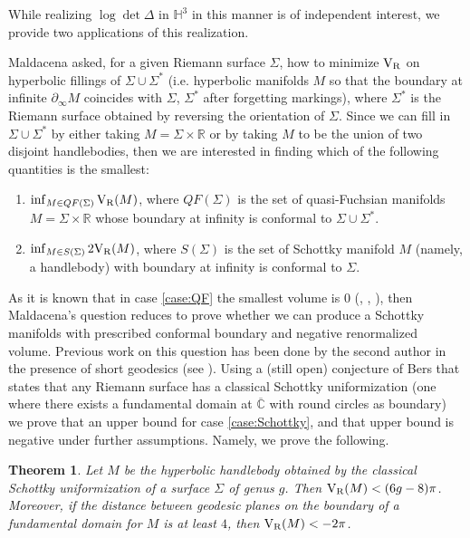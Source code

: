 \documentclass[12pt]{amsart}
\newcommand{\VR}{{\rm V}_{\rm R}}
\newtheorem{maintheorem}{Theorem}[section]
\begin{document}
While realizing $\log\det\Delta$ in $\mathbb{H}^3$ in this manner is of independent interest, we provide two applications of this realization.

Maldacena \cite{Maldacena} asked, for a given Riemann surface $\Sigma$, how to minimize $\VR$ on hyperbolic fillings of $\Sigma\cup \Sigma^*$ (i.e. hyperbolic manifolds $M$ so that the boundary at infinite $\partial_\infty M$ coincides with $\Sigma$, $\Sigma^*$ after forgetting markings), where $\Sigma^*$ is the Riemann surface obtained by reversing the orientation of $\Sigma$. Since we can fill in $\Sigma\cup\Sigma^*$ by either taking $M=\Sigma\times\mathbb{R}$ or by taking $M$ to be the union of two disjoint handlebodies, then we are interested in finding which of the following quantities is the smallest:

\begin{enumerate}[label=(\alph*)]
    \item\label{case:QF} $\inf_{M\in QF(\Sigma)} \VR(M)$, where $QF(\Sigma)$ is the set of quasi-Fuchsian manifolds $M=\Sigma\times\mathbb{R}$ whose boundary at infinity is conformal to $\Sigma\cup\Sigma^*$.
    \item\label{case:Schottky} $\inf_{M\in S(\Sigma)} 2\VR(M)$, where $S(\Sigma)$ is the set of Schottky manifold $M$ (namely, a handlebody) with boundary at infinity is conformal to $\Sigma$.
\end{enumerate}

As it is known that in case \ref{case:QF} the smallest volume is $0$ (\cite{BridgemanBrockBromberg}, \cite{FVP17}, \cite{BridgemanBrombergVP}), then Maldacena's question reduces to prove whether we can produce a Schottky manifolds with prescribed conformal boundary and negative renormalized volume. Previous work on this question has been done by the second author in the presence of short geodesics (see \cite{FVP19}). Using a (still open) conjecture of Bers that states that any Riemann surface has a classical Schottky uniformization (one where there exists a fundamental domain at $\overline{\mathbb{C}}$ with round circles as boundary) we prove that an upper bound for case \ref{case:Schottky}, and that upper bound is negative under further assumptions. Namely, we prove the following.

\begin{maintheorem}\label{thm:main1}
Let $M$ be the hyperbolic handlebody obtained by the classical Schottky uniformization of a surface $\Sigma$ of genus $g$. Then $\VR(M) < (6g-8)\pi$. Moreover, if the distance between geodesic planes on the boundary of a fundamental domain for $M$ is at least $4$, then $\VR(M)<-2\pi$.
\end{maintheorem}
\end{document}
